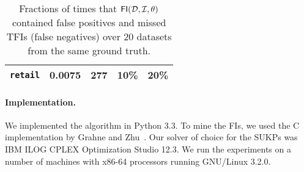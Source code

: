 \begin{table*}[tbp]
\begin{tabular}{llrrr}
\midrule
\texttt{retail} & 0.0075 & 277 & 10\% & 20\% \\
\bottomrule
\end{tabular}
\caption{Fractions of times that $\mathsf{FI}({\cal D},{\cal I},\theta)$ contained false positives
and missed TFIs (false negatives) over 20 datasets from the same ground truth.}
\label{table:fp}
\end{table*}


\paragraph*{Implementation.}
We implemented the algorithm in Python 3.3. %
To mine the FIs, we used the C implementation by Grahne
and Zhu~\citep{GrahneZ03}. %
Our solver of choice for the SUKPs was IBM\textsuperscript{\textregistered}
ILOG\textsuperscript{\textregistered} CPLEX\textsuperscript{\textregistered}
Optimization Studio 12.3. %
We run the experiments on a number of machines with x86-64 processors running
GNU/Linux 3.2.0.

